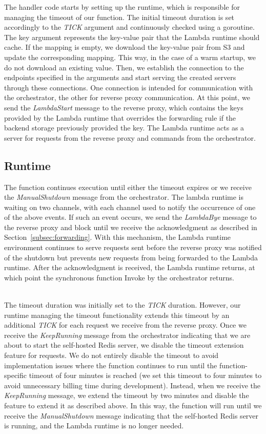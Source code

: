 \newpage
\noindent
The handler code starts by setting up the runtime, which is responsible for managing the timeout of our function. The initial timeout duration is set accordingly to the \emph{TICK} argument and continuously checked using a goroutine. The key argument represents the key-value pair that the Lambda runtime should cache. If the mapping is empty, we download the key-value pair from S3 and update the corresponding mapping. This way, in the case of a warm startup, we do not download an existing value. Then, we establish the connection to the endpoints specified in the arguments and start serving the created servers through these connections. One connection is intended for communication with the orchestrator, the other for reverse proxy communication. At this point, we send the \emph{LambdaStart} message to the reverse proxy, which contains the keys provided by the Lambda runtime that overrides the forwarding rule if the backend storage previously provided the key. The Lambda runtime acts as a server for requests from the reverse proxy and commands from the orchestrator.

\subsection{Runtime}
The function continues execution until either the timeout expires or we receive the \emph{ManualShutdown} message from the orchestrator. The lambda runtime is waiting on two channels, with each channel used to notify the occurrence of one of the above events. If such an event occurs, we send the \emph{LambdaBye} message to the reverse proxy and block until we receive the acknowledgment as described in Section~\ref{subsec:forwarding}. With this mechanism, the Lambda runtime environment continues to serve requests sent before the reverse proxy was notified of the shutdown but prevents new requests from being forwarded to the Lambda runtime. After the acknowledgment is received, the Lambda runtime returns, at which point the synchronous function Invoke by the orchestrator returns.

~\\
The timeout duration was initially set to the \emph{TICK} duration. However, our runtime managing the timeout functionality extends this timeout by an additional \emph{TICK} for each  request we receive from the reverse proxy. Once we receive the \emph{KeepRunning} message from the orchestrator indicating that we are about to start the self-hosted Redis server, we disable the timeout extension feature for  requests. We do not entirely disable the timeout to avoid implementation issues where the function continues to run until the function-specific timeout of four minutes is reached (we set this timeout to four minutes to avoid unnecessary billing time during development). Instead, when we receive the \emph{KeepRunning} message, we extend the timeout by two minutes and disable the feature to extend it as described above. In this way, the function will run until we receive the \emph{ManualShutdown} message indicating that the self-hosted Redis server is running, and the Lambda runtime is no longer needed.

